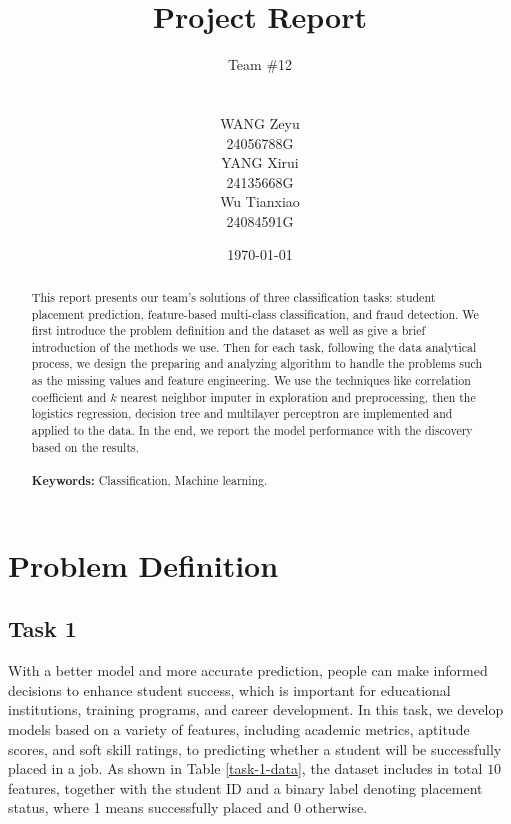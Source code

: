 \documentclass[11pt]{article}
\title{\Huge Project Report}
\author{
  \parbox{\textwidth}{
    \vspace{0.5cm}
    \centering \LARGE Team \#12
    \vspace{0.5cm}
  } \\
  \parbox{0.2\textwidth}{
    \centering WANG Zeyu \\
    \centering 24056788G
  }
  \parbox{0.2\textwidth}{
    \centering YANG Xirui \\
    \centering 24135668G
  }
  \parbox{0.2\textwidth}{
    \centering Wu Tianxiao \\
    \centering 24084591G
  }
}
\date{\today}
\begin{document}
\maketitle
\thispagestyle{empty}
\setcounter{page}{0}

\vspace{1cm}

\begin{abstract}
  This report presents our team's solutions of three classification tasks: student placement prediction, feature-based multi-class classification, and fraud detection. We first introduce the problem definition and the dataset as well as give a brief introduction of the methods we use. Then for each task, following the data analytical process, we design the preparing and analyzing algorithm to handle the problems such as the missing values and feature engineering. We use the techniques like correlation coefficient and $k$ nearest neighbor imputer in exploration and preprocessing, then the logistics regression, decision tree and multilayer perceptron are implemented and applied to the data. In the end, we report the model performance with the discovery based on the results.
  \\\\
  \textbf{Keywords:} Classification, Machine learning.
\end{abstract}

\newpage

\section{Problem Definition}

\subsection{Task 1}

With a better model and more accurate prediction, people can make informed decisions to enhance student success, which is important for educational institutions, training programs, and career development. In this task, we develop models based on a variety of features, including academic metrics, aptitude scores, and soft skill ratings, to predicting whether a student will be successfully placed in a job. As shown in Table \ref{task-1-data}, the dataset includes in total $10$ features, together with the student ID and a binary label denoting placement status, where 1 means successfully placed and 0 otherwise.
\end{document}

